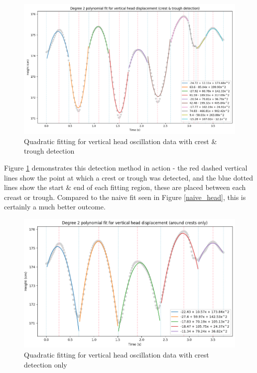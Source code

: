 \documentclass[12pt, a4paper]{article}
\begin{document}
\begin{figure}[H]
    \centering
    \includegraphics[width=\textwidth]{p_peaks_head_2.png}
    \caption{Quadratic fitting for vertical head oscillation data with crest \& trough detection} 
    \label{peaks_head}
\end{figure}

Figure \ref{peaks_head} demonstrates this detection method in action - the red
dashed vertical lines show the point at which a crest or trough was detected,
and the blue dotted lines show the start \& end of each fitting region, these
are placed between each creast or trough. Compared to the naive fit seen in
Figure \ref{naive_head}, this is certainly a much better outcome.

\begin{figure}[H]
    \centering
    \includegraphics[width=\textwidth]{p_peaks_crestsonly_head_2.png}
    \caption{Quadratic fitting for vertical head oscillation data with crest detection only} 
    \label{crestsonly_head}
\end{figure}
\end{document}
